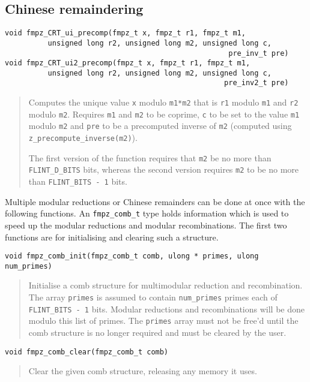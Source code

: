 \documentclass[a4paper,10pt]{article}
\newcommand{\code}{\lstinline}
\begin{document}
\subsection{Chinese remaindering}
\begin{lstlisting}
void fmpz_CRT_ui_precomp(fmpz_t x, fmpz_t r1, fmpz_t m1, 
          unsigned long r2, unsigned long m2, unsigned long c, 
                                                    pre_inv_t pre)
void fmpz_CRT_ui2_precomp(fmpz_t x, fmpz_t r1, fmpz_t m1, 
          unsigned long r2, unsigned long m2, unsigned long c, 
                                                   pre_inv2_t pre)
\end{lstlisting}
\begin{quote}
Computes the unique value \code{x} modulo \code{m1*m2} that is \code{r1} modulo \code{m1} and \code{r2} modulo \code{m2}. Requires \code{m1} and \code{m2} to be coprime, \code{c} to be set to the value \code{m1} modulo \code{m2} and \code{pre} to be a precomputed inverse of \code{m2} (computed using \code{z_precompute_inverse(m2)}). 

The first version of the function requires that \code{m2} be no more than \code{FLINT_D_BITS} bits, whereas the second version requires \code{m2} to be no more than \code{FLINT_BITS - 1} bits.
\end{quote}

Multiple modular reductions or Chinese remainders can be done at once with the following functions. An \code{fmpz_comb_t} type holds information which is used to speed up the modular reductions and modular recombinations. The first two functions are for initialising and clearing such a structure.

\begin{lstlisting}
void fmpz_comb_init(fmpz_comb_t comb, ulong * primes, ulong num_primes)
\end{lstlisting}
\begin{quote}
Initialise a comb structure for multimodular reduction and recombination. The array \code{primes} is assumed to contain \code{num_primes} primes each of \code{FLINT_BITS - 1} bits. Modular reductions and recombinations will be done modulo this list of primes. The \code{primes} array must not be free'd until the comb structure is no longer required and must be cleared by the user.
\end{quote}

\begin{lstlisting}
void fmpz_comb_clear(fmpz_comb_t comb) 
\end{lstlisting}
\begin{quote}
Clear the given comb structure, releasing any memory it uses. 
\end{quote}
\end{document}
